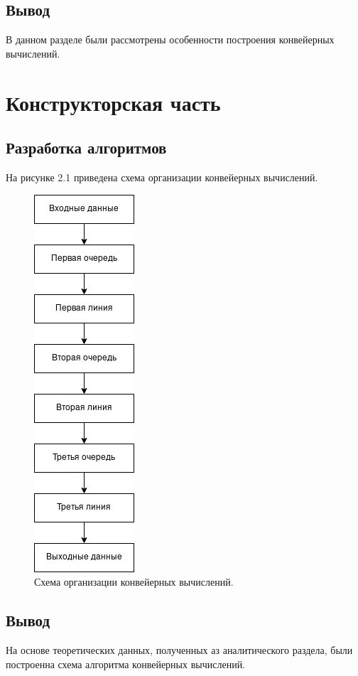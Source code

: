 \documentclass[12pt]{report}
\begin{document}
\section*{Вывод}
	В данном разделе были рассмотрены особенности построения конвейерных вычислений.

\chapter{Конструкторская часть}
\section{Разработка алгоритмов}

На рисунке 2.1 приведена схема организации конвейерных вычислений.

\begin{figure}[h]
	\centering
	\includegraphics[scale=0.6]{report_files/scheme_lab05.jpg}
	\caption{Схема организации конвейерных вычислений.}
	\label{fig:mpr}
\end{figure}


\section*{Вывод}
На основе теоретических данных, полученных аз аналитического раздела, были построенна схема алгоритма конвейерных вычислений.
\end{document}
